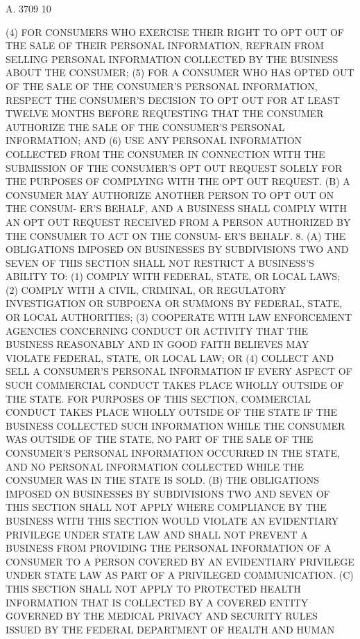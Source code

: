 A. 3709                            10

   (4) FOR CONSUMERS WHO EXERCISE THEIR RIGHT TO OPT OUT OF THE  SALE  OF
 THEIR  PERSONAL  INFORMATION,  REFRAIN FROM SELLING PERSONAL INFORMATION
 COLLECTED BY THE BUSINESS ABOUT THE CONSUMER;
   (5)  FOR  A  CONSUMER  WHO HAS OPTED OUT OF THE SALE OF THE CONSUMER'S
 PERSONAL INFORMATION, RESPECT THE CONSUMER'S DECISION TO OPT OUT FOR  AT
 LEAST  TWELVE  MONTHS  BEFORE REQUESTING THAT THE CONSUMER AUTHORIZE THE
 SALE OF THE CONSUMER'S PERSONAL INFORMATION; AND
   (6) USE ANY  PERSONAL  INFORMATION  COLLECTED  FROM  THE  CONSUMER  IN
 CONNECTION  WITH THE SUBMISSION OF THE CONSUMER'S OPT OUT REQUEST SOLELY
 FOR THE PURPOSES OF COMPLYING WITH THE OPT OUT REQUEST.
   (B) A CONSUMER MAY AUTHORIZE ANOTHER PERSON TO OPT OUT ON THE  CONSUM-
 ER'S  BEHALF,  AND  A  BUSINESS  SHALL  COMPLY  WITH  AN OPT OUT REQUEST
 RECEIVED FROM A PERSON AUTHORIZED BY THE CONSUMER TO ACT ON THE  CONSUM-
 ER'S BEHALF.
   8.  (A)  THE OBLIGATIONS IMPOSED ON BUSINESSES BY SUBDIVISIONS TWO AND
 SEVEN OF THIS SECTION SHALL NOT RESTRICT A BUSINESS'S ABILITY TO:
   (1) COMPLY WITH FEDERAL, STATE, OR LOCAL LAWS;
   (2) COMPLY WITH A CIVIL,  CRIMINAL,  OR  REGULATORY  INVESTIGATION  OR
 SUBPOENA OR SUMMONS BY FEDERAL, STATE, OR LOCAL AUTHORITIES;
   (3)  COOPERATE  WITH  LAW  ENFORCEMENT  AGENCIES CONCERNING CONDUCT OR
 ACTIVITY THAT THE BUSINESS REASONABLY AND IN  GOOD  FAITH  BELIEVES  MAY
 VIOLATE FEDERAL, STATE, OR LOCAL LAW; OR
   (4) COLLECT AND SELL A CONSUMER'S PERSONAL INFORMATION IF EVERY ASPECT
 OF  SUCH COMMERCIAL CONDUCT TAKES PLACE WHOLLY OUTSIDE OF THE STATE. FOR
 PURPOSES OF THIS SECTION, COMMERCIAL CONDUCT TAKES PLACE WHOLLY  OUTSIDE
 OF  THE  STATE  IF  THE  BUSINESS  COLLECTED  SUCH INFORMATION WHILE THE
 CONSUMER WAS OUTSIDE OF THE STATE, NO PART OF THE SALE OF THE CONSUMER'S
 PERSONAL INFORMATION OCCURRED IN THE STATE, AND NO PERSONAL  INFORMATION
 COLLECTED WHILE THE CONSUMER WAS IN THE STATE IS SOLD.
   (B)  THE  OBLIGATIONS  IMPOSED  ON  BUSINESSES BY SUBDIVISIONS TWO AND
 SEVEN OF THIS SECTION SHALL NOT APPLY WHERE COMPLIANCE BY  THE  BUSINESS
 WITH THIS SECTION WOULD VIOLATE AN EVIDENTIARY PRIVILEGE UNDER STATE LAW
 AND SHALL NOT PREVENT A BUSINESS FROM PROVIDING THE PERSONAL INFORMATION
 OF  A  CONSUMER  TO  A  PERSON COVERED BY AN EVIDENTIARY PRIVILEGE UNDER
 STATE LAW AS PART OF A PRIVILEGED COMMUNICATION.
   (C) THIS SECTION SHALL NOT APPLY TO PROTECTED HEALTH INFORMATION  THAT
 IS  COLLECTED  BY  A  COVERED ENTITY GOVERNED BY THE MEDICAL PRIVACY AND
 SECURITY RULES ISSUED BY THE FEDERAL  DEPARTMENT  OF  HEALTH  AND  HUMAN
